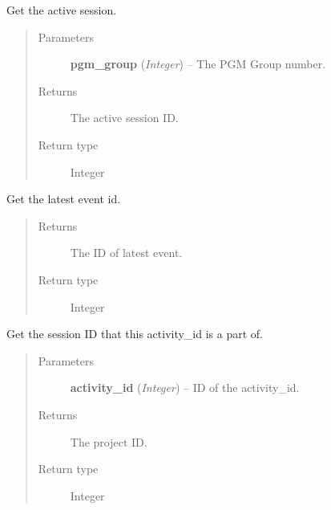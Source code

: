 \documentclass[letterpaper,10pt,english]{sphinxmanual}
\begin{document}
\begin{fulllineitems}
\label{controller:controller.session.get_active_session}
Get the active session.
\begin{quote}\begin{description}
\item[{Parameters}] \leavevmode
\textbf{pgm\_group} (\emph{Integer}) -- The PGM Group number.

\item[{Returns}] \leavevmode
The active session ID.

\item[{Return type}] \leavevmode
Integer

\end{description}\end{quote}

\end{fulllineitems}


\begin{fulllineitems}
\label{controller:controller.session.get_latest_event_id}
Get the latest event id.
\begin{quote}\begin{description}
\item[{Returns}] \leavevmode
The ID of latest event.

\item[{Return type}] \leavevmode
Integer

\end{description}\end{quote}

\end{fulllineitems}


\begin{fulllineitems}
\label{controller:controller.session.get_session_id_by_activity}
Get the session ID that this activity\_id is a part of.
\begin{quote}\begin{description}
\item[{Parameters}] \leavevmode
\textbf{activity\_id} (\emph{Integer}) -- ID of the activity\_id.

\item[{Returns}] \leavevmode
The project ID.

\item[{Return type}] \leavevmode
Integer

\end{description}\end{quote}

\end{fulllineitems}
\end{document}
